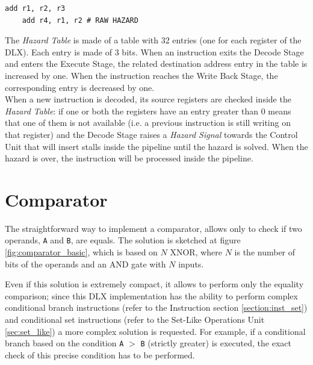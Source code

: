 \begin{lstlisting}[style=mips,nolol, caption={Example of DLX ASM code for RAW Hazard},label=raw_hazard]
	add r1, r2, r3
	add r4, r1, r2 # RAW HAZARD
\end{lstlisting}

The \emph{Hazard Table} is made of a table with 32 entries (one for each register of the DLX). Each entry is made of 3 bits. When an instruction exits the Decode Stage and enters the Execute Stage, the related destination address entry in the table is increased by one. When the instruction reaches the Write Back Stage, the corresponding entry is decreased by one.\\

When a new instruction is decoded, its source registers are checked inside the \emph{Hazard Table}: if one or both the registers have an entry greater than 0 means that one of them is not available (i.e. a previous instruction is still writing on that register) and the Decode Stage raises a \emph{Hazard Signal} towards the Control Unit that will insert stalls inside the pipeline until the hazard is solved. When the hazard is over, the instruction will be processed inside the pipeline.

\section{Comparator}
\label{sec:comparator}
The straightforward way to implement a comparator, allows only to check if two operands, \texttt{A} and \texttt{B}, are equals. The solution is sketched at figure \ref{fig:comparator_basic}, which is based on $N$ XNOR, where $N$ is the number of bits of the operands and an AND gate with $N$ inputs.

Even if this solution is extremely compact, it allows to perform only the equality comparison; since this DLX implementation has the ability to perform complex conditional branch instructions (refer to the Instruction section \ref{section:inst_set}) and conditional set instructions (refer to the Set-Like Operations Unit \ref{sec:set_like}) a more complex solution is requested. For example, if a conditional branch based on the condition \texttt{A} $>$ \texttt{B} (strictly greater) is executed, the exact check of this precise condition has to be performed.

